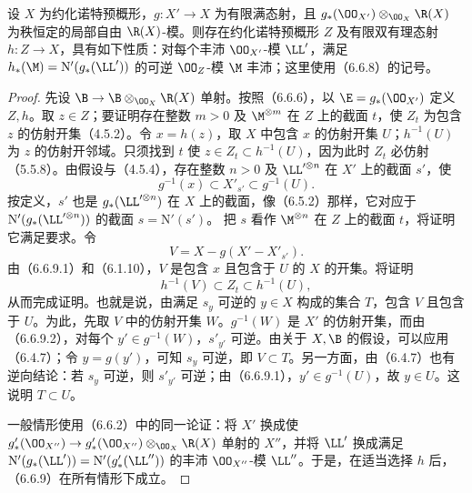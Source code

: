 设 $X$ 为约化诺特预概形，$g:X'\to X$ 为有限满态射，且 $g_*(\OO_{X'})\otimes_{\OO_X}\R(X)$ 为秩恒定的局部自由 $\R(X)$-模。则存在约化诺特预概形 $Z$ 及有限双有理态射 $h:Z\to X$，具有如下性质：对每个丰沛 $\OO_{X'}$-模 $\LL'$，满足 $h_*(\M)=\mathrm N'(g_*(\LL'))$ 的可逆 $\OO_Z$-模 $\M$ 丰沛；这里使用（6.6.8）的记号。
\begin{proof}
先设 $\B\to\B\otimes_{\OO_X}\R(X)$ 单射。按照（6.6.6），以 $\E=g_*(\OO_{X'})$ 定义 $Z,h$。取 $z\in Z$；要证明存在整数 $m>0$ 及 $\M^{\otimes m}$ 在 $Z$ 上的截面 $t$，使 $Z_t$ 为包含 $z$ 的仿射开集（4.5.2）。令 $x=h(z)$，取 $X$ 中包含 $x$ 的仿射开集 $U$；$h^{-1}(U)$ 为 $z$ 的仿射开邻域。只须找到 $t$ 使 $z\in Z_t\subset h^{-1}(U)$，因为此时 $Z_t$ 必仿射（5.5.8）。由假设与（4.5.4），存在整数 $n>0$ 及 $\LL'^{\otimes n}$ 在 $X'$ 上的截面 $s'$，使
\begin{equation}\tag{6.6.9.1}
g^{-1}(x)\subset X'_{s'}\subset g^{-1}(U).
\end{equation}
按定义，$s'$ 也是 $g_*(\LL'^{\otimes n})$ 在 $X$ 上的截面，像（6.5.2）那样，它对应于 $\mathrm N'(g_*(\LL'^{\otimes n}))$ 的截面 $s=\mathrm N'(s')$。
把 $s$ 看作 $\M^{\otimes n}$ 在 $Z$ 上的截面 $t$，将证明它满足要求。令
\begin{equation}\tag{6.6.9.2}
V=X-g(X'-X'_{s'}).
\end{equation}
由（6.6.9.1）和（6.1.10），$V$ 是包含 $x$ 且包含于 $U$ 的 $X$ 的开集。将证明
\begin{equation}\tag{6.6.9.3}
h^{-1}(V)\subset Z_t\subset h^{-1}(U),
\end{equation}
从而完成证明。也就是说，由满足 $s_y$ 可逆的 $y\in X$ 构成的集合 $T$，包含 $V$ 且包含于 $U$。为此，先取 $V$ 中的仿射开集 $W$。$g^{-1}(W)$ 是 $X'$ 的仿射开集，而由（6.6.9.2），对每个 $y'\in g^{-1}(W)$，$s'_{y'}$ 可逆。由关于 $X,\B$ 的假设，可以应用（6.4.7）；令 $y=g(y')$，可知 $s_y$ 可逆，即 $V\subset T$。另一方面，由（6.4.7）也有逆向结论：若 $s_y$ 可逆，则 $s'_{y'}$ 可逆；由（6.6.9.1），$y'\in g^{-1}(U)$，故 $y\in U$。这说明 $T\subset U$。

一般情形使用（6.6.2）中的同一论证：将 $X'$ 换成使
$g'_*(\OO_{X''})\to g'_*(\OO_{X''})\otimes_{\OO_X}\R(X)$ 单射的 $X''$，并将 $\LL'$ 换成满足
$\mathrm N'(g_*(\LL'))=\mathrm N'(g'_*(\LL''))$ 的丰沛 $\OO_{X''}$-模 $\LL''$。于是，在适当选择 $h$ 后，（6.6.9）在所有情形下成立。
\end{proof}

